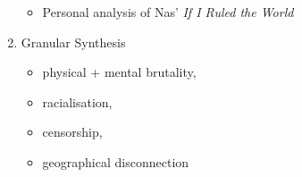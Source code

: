 \documentclass[14pt, letterpaper]{report}
\begin{document}
\begin{enumerate}
\begin{itemize}
				\item Personal analysis of Nas' \textit{If I Ruled the World}

			\end{itemize}

		\item   Granular Synthesis
			\begin{itemize}
				\item physical + mental brutality, 
				\item racialisation, 
				\item censorship, 
				\item geographical disconnection
			\end{itemize}
	
	\end{enumerate}

\clearpage

\nocite{*}

\printbibliography
\end{document}
